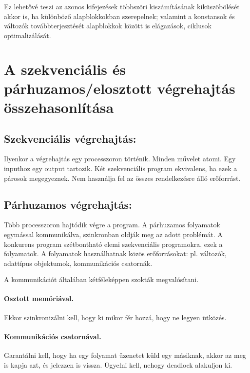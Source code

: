 \documentclass[margin=0px]{article}
\begin{document}
	
	Ez lehetővé teszi az azonos kifejezések többszöri kiszámításának kiküszöbölését akkor is, ha különböző alapblokkokban szerepelnek; valamint a konstansok és változók továbbterjesztését alapblokkok között is elágazások, ciklusok optimalizálását.

	
\section{A szekvenciális és	párhuzamos/elosztott végrehajtás összehasonlítása}
	
\subsection{Szekvenciális végrehajtás:}

	Ilyenkor a végrehajtás egy processzoron történik. Minden művelet atomi. Egy inputhoz egy output tartozik. Két szekvenciális program ekvivalens, ha ezek a párosok megegyeznek. Nem használja fel az összes rendelkezésre álló erőforrást.


\subsection{Párhuzamos végrehajtás:}		
	
	Több processzoron hajtódik végre a program. A párhuzamos folyamatok egymással kommunikálva, szinkronban oldják meg az adott problémát. A konkurens program szétbontható elemi szekvenciális programokra, ezek a folyamatok. A folyamatok használhatnak közös erőforrásokat: pl. változók, adattípus  objektumok, kommunikációs csatornák.
	
	A kommunikációt általában kétféleképpen szokták megvalósítani.
	\paragraph{Osztott memóriával.} Ekkor szinkronizálni kell, hogy ki mikor fér hozzá, hogy ne legyen ütközés.

	\paragraph{Kommunikációs csatornával.} Garantálni kell, hogy ha egy folyamat üzenetet küld egy másiknak, akkor az meg is kapja azt, és jelezzen is vissza. Ügyelni kell, nehogy deadlock alakuljon ki.
		
\end{document}
